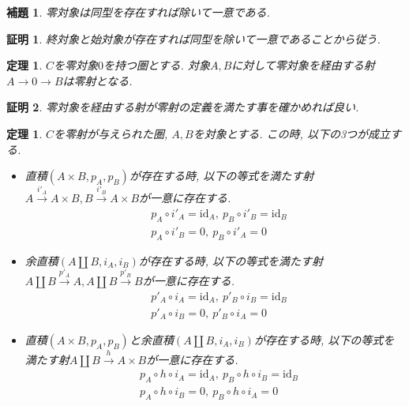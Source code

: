 \documentclass[a4paper,12pt]{ltjsarticle}
\theoremstyle{break}
\newtheorem{lem}[thm]{補題}
\newtheorem{thrm}[thm]{定理}
\newtheorem*{prf}{証明}
\newcommand{\xr}[1]{\xrightarrow{#1}}
\newcommand{\id}{\mathrm{id}}
\newcommand{\ci}{\circ}
\newcommand{\ti}{\times}
\newcommand{\am}{\amalg}
\numberwithin{equation}{section}
\begin{document}
\begin{lem}
  零対象は同型を存在すれば除いて一意である. 
\end{lem}

\begin{prf}
  終対象と始対象が存在すれば同型を除いて一意であることから従う. 
\end{prf}


\begin{thrm}
  $C$を零対象$0$を持つ圏とする. 
  対象$A,B$に対して零対象を経由する射$A \to 0 \to B$は零射となる. 
\end{thrm} 

\begin{prf}
  零対象を経由する射が零射の定義を満たす事を確かめれば良い. 
\end{prf}


\begin{thrm}
  $C$を零射が与えられた圏, $A,B$を対象とする. 
  この時, 以下の3つが成立する. 
  \begin{itemize}
    \item 直積$(A \ti B,p_A,p_B)$が存在する時, 以下の等式を満たす射$A \xr{i'_A} A \ti B, B \xr{i'_B} A \ti B$が一意に存在する. 
    \begin{align*}
      &p_A \ci i'_A = \id_A, ~ p_B \ci i'_B = \id_B \\
      &p_A \ci i'_B = 0, ~ p_B \ci i'_A = 0
    \end{align*}
    \item 余直積$(A \am B,i_A,i_B)$が存在する時, 以下の等式を満たす射$A \am B \xr{p'_A} A,A \am B \xr{p'_B} B$が一意に存在する. 
    \begin{align*}
      &p'_A \ci i_A = \id_A, ~ p'_B \ci i_B = \id_B \\
      &p'_A \ci i_B = 0, ~ p'_B \ci i_A = 0
    \end{align*}
    \item 直積$(A \ti B,p_A,p_B)$と余直積$(A \am B,i_A,i_B)$が存在する時, 以下の等式を満たす射$A \am B \xr{h} A \ti B$が一意に存在する. 
    \begin{align*}
      &p_A \ci h \ci i_A = \id_A, ~ p_B \ci h \ci i_B = \id_B \\
      &p_A \ci h \ci i_B = 0, ~ p_B \ci h \ci i_A = 0
    \end{align*}
  \end{itemize}
\end{thrm}
\end{document}
